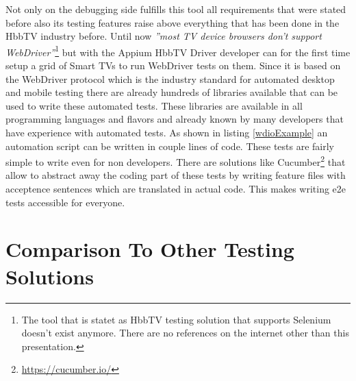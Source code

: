 Not only on the debugging side fulfills this tool all requirements that were stated before also its testing
features raise above everything that has been done in the HbbTV industry before. Until now \textit{''most TV
device browsers don’t support WebDriver''}\cite{sengo}\footnote{The tool that is statet as HbbTV testing solution
that supports Selenium doesn't exist anymore. There are no references on the internet other than this presentation.}
but with the Appium HbbTV Driver developer can for the first time setup a grid of Smart TVs to run WebDriver
tests on them. Since it is based on the WebDriver protocol which is the industry standard for automated desktop
and mobile testing there are already hundreds of libraries available that can be used to write these automated tests.
These libraries are available in all programming languages and flavors and already known by many developers that
have experience with automated tests. As shown in listing \ref{wdioExample} an automation script can be written
in couple lines of code. These tests are fairly simple to write even for non developers. There are solutions like
Cucumber\footnote{\url{https://cucumber.io/}} that allow to abstract away the coding part of these tests by writing
feature files with acceptence sentences which are translated in actual code. This makes writing e2e tests accessible
for everyone.

\section{Comparison To Other Testing Solutions\label{sec:businessmodel}}

